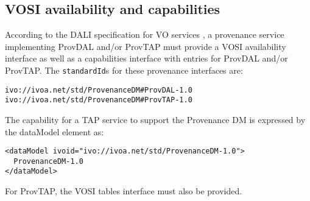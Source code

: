 

\subsection{VOSI availability and capabilities}
According to the DALI specification for VO services \citep{std:DALI}, a provenance service implementing ProvDAL and/or ProvTAP must provide a VOSI availability interface as well as a capabilities interface with entries for ProvDAL and/or ProvTAP. The \texttt{standardId}s for these provenance interfaces are:

\begin{verbatim}
ivo://ivoa.net/std/ProvenanceDM#ProvDAL-1.0
ivo://ivoa.net/std/ProvenanceDM#ProvTAP-1.0
\end{verbatim}

The capability for a TAP service to support the Provenance DM is expressed by
the dataModel element as:
\begin{verbatim}
<dataModel ivoid="ivo://ivoa.net/std/ProvenanceDM-1.0">
  ProvenanceDM-1.0
</dataModel>
\end{verbatim}

For ProvTAP, the VOSI tables interface must also be provided.

